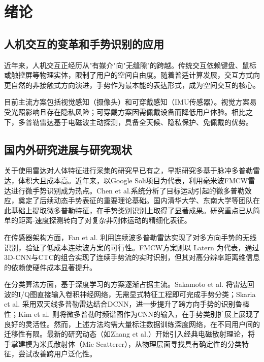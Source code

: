 \section{绪论}

\subsection{人机交互的变革和手势识别的应用}

近年来，人机交互正经历从"有媒介"向"无缝隙"的跨越。传统交互依赖键盘、鼠标或触控屏等物理实体，限制了用户的空间自由度。随着普适计算发展，交互方式向更自然的非接触式方向演进，手势作为最本能的表达形式，成为空间交互的核心。

目前主流方案包括视觉感知（摄像头）和可穿戴感知（IMU传感器）。视觉方案易受光照影响且存在隐私风险\cite{pavlovic1997visual}；可穿戴方案因需佩戴设备而降低用户体验\cite{berman2012sensors}。相比之下，多普勒雷达基于电磁波主动探测，具备全天候、隐私保护、免佩戴的优势。

\subsection{国内外研究进展与研究现状}

关于使用雷达对人体特征进行采集的研究早已有之\cite{lin1975noninvasive}，早期研究多基于脉冲多普勒雷达，体积大且成本高。近年来，以Google Soli\cite{lien2016soli}项目为代表，利用毫米波FMCW雷达进行微手势识别成为热点。Chen et al.\cite{chen2006microdoppler}系统分析了目标运动引起的微多普勒效应，奠定了后续动态手势表征的重要理论基础。国内清华大学、东南大学等团队在此基础上提取微多普勒特征，在手势类别识别上取得了显著成果。研究重点已从简单的距离-速度探测转向了对复杂非刚体运动的精细化表征。

在传感器架构方面，Fan et al.\cite{fan2016wireless} 利用连续波多普勒雷达实现了对多方向手势的无线识别，验证了低成本连续波方案的可行性。FMCW方案则以 Latern\cite{Latern} 为代表，通过3D-CNN与CTC的组合实现了连续手势流的实时识别，但其对高分辨率距离维信息的依赖使硬件成本显著提升。

在分类算法方面，基于深度学习的方案逐渐占据主流。Sakamoto et al.\cite{sakamoto2018hand} 将雷达回波的I/Q图直接输入卷积神经网络，无需显式特征工程即可完成手势分类；Skaria et al.\cite{skaria2019hand} 采用双天线多普勒雷达结合DCNN，进一步提升了跨方向手势的识别鲁棒性；Kim et al.\cite{kim2016hand} 则将微多普勒时频谱图作为CNN的输入，在手势类别扩展上展现了良好的灵活性。然而，上述方法均需大量标注数据训练深度网络，在不同用户间的迁移性有限。最新的研究动态（如Zhang et al.\cite{zhang2021deterministic}）开始引入经典电磁散射理论，将手掌建模为米氏散射体（Mie Scatterer），从物理层面寻找具有确定性的分类特征，尝试改善跨用户泛化性。

